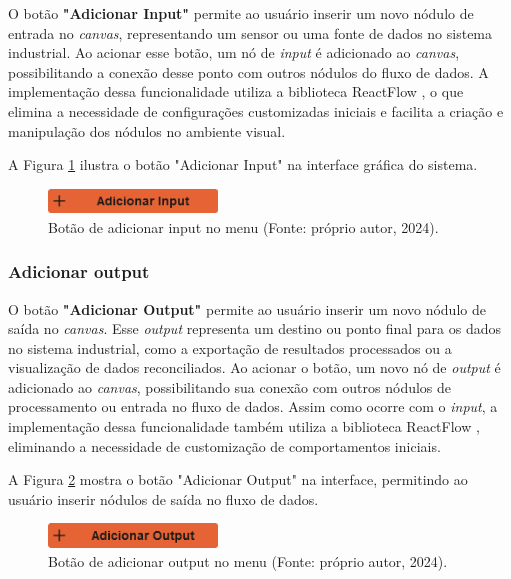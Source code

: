 O botão \textbf{"Adicionar Input"} permite ao usuário inserir um novo nódulo de entrada no \textit{canvas}, representando um sensor ou uma fonte de dados no sistema industrial. Ao acionar esse botão, um nó de \textit{input} é adicionado ao \textit{canvas}, possibilitando a conexão desse ponto com outros nódulos do fluxo de dados. A implementação dessa funcionalidade utiliza a biblioteca ReactFlow \cite{reactflow}, o que elimina a necessidade de configurações customizadas iniciais e facilita a criação e manipulação dos nódulos no ambiente visual.

A Figura \ref{Fig:AddInputButton} ilustra o botão "Adicionar Input" na interface gráfica do sistema.

\begin{figure}[htbp]
    \centering
    \includegraphics[width=0.4\textwidth]{figuras/add-input-button.png}
    \caption{Botão de adicionar input no menu (Fonte: próprio autor, 2024).}
    \label{Fig:AddInputButton}
\end{figure}


\subsubsection{Adicionar output}

O botão \textbf{"Adicionar Output"} permite ao usuário inserir um novo nódulo de saída no \textit{canvas}. Esse \textit{output} representa um destino ou ponto final para os dados no sistema industrial, como a exportação de resultados processados ou a visualização de dados reconciliados. Ao acionar o botão, um novo nó de \textit{output} é adicionado ao \textit{canvas}, possibilitando sua conexão com outros nódulos de processamento ou entrada no fluxo de dados. Assim como ocorre com o \textit{input}, a implementação dessa funcionalidade também utiliza a biblioteca ReactFlow \cite{reactflow}, eliminando a necessidade de customização de comportamentos iniciais.

A Figura \ref{Fig:AddOutputButton} mostra o botão "Adicionar Output" na interface, permitindo ao usuário inserir nódulos de saída no fluxo de dados.

\begin{figure}[htbp]
    \centering
    \includegraphics[width=0.4\textwidth]{figuras/add-output-button.png}
    \caption{Botão de adicionar output no menu (Fonte: próprio autor, 2024).}
    \label{Fig:AddOutputButton}
\end{figure}

